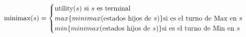 \documentclass[preview]{standalone}
\begin{document}
\begin{align*}
\text{minimax($s$)} =  \begin{cases}\text{utility($s$) si $s$ es terminal} \cr
                                 max\{minimax(\text{estados hijos de $s$})\} \text{si es el turno de Max en $s$} \cr
                                 min\{minimax(\text{estados hijos de $s$})\} \text{si es el turno de Min en $s$} \cr
                                 \end{cases}
\end{align*}
\end{document}
